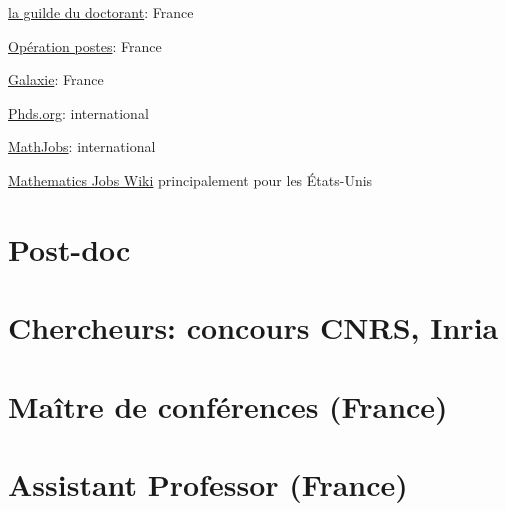 


\href{http://guilde.jeunes-chercheurs.org/}{la guilde du doctorant}: France

\href{http://postes.smai.emath.fr/}{Opération postes}: France

\href{https://www.galaxie.enseignementsup-recherche.gouv.fr/ensup/candidats.html}{Galaxie}: France

\href{http://www.phds.org/}{Phds.org}: international

\href{https://www.mathjobs.org/jobs}{MathJobs}: international

\href{http://notable.math.ucdavis.edu/wiki/Mathematics_Jobs_Wiki}{Mathematics Jobs Wiki} principalement
pour les \'Etats-Unis

\section{Post-doc}

\section{Chercheurs: concours CNRS, Inria}

\section{Maître de conférences (France)}

\section{Assistant Professor (France)}
